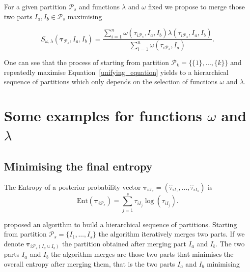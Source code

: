 \documentclass[10pt, a4paper]{article}
\newcommand{\m}[1]{\boldsymbol{#1}}
\begin{document}
\begin{spacing}{1.9}

For a given partition $\mathcal{P}_s$ and functions $\lambda$ and $\omega$ fixed we propose to merge those two parts $I_a, I_b \in \mathcal{P}_s$ maximising

\begin{equation}\label{unifying_equation}
S_{\omega, \lambda}( \m\tau_{\mathcal{P}_s},  I_a,  I_b) = \frac{\sum_{i=1}^n \omega(\tau_{i \mathcal{P}_s}, I_a, I_b) \lambda(\tau_{i \mathcal{P}_s}, I_a, I_b)}{\sum_{i=1}^n \omega(\tau_{i \mathcal{P}_s}, I_a) }.
\end{equation}


One can see that the process of starting from partition $\mathcal{P}_k = \{ \{1\}, \dots, \{k\} \}$ and repeatedly maximise Equation~\ref{unifying_equation} yields to a hierarchical sequence of partitions which only depends on the selection of functions $\omega$ and $\lambda$.


\section{Some examples for functions $\omega$ and $\lambda$}

\subsection{Minimising the final entropy}
\label{entropy_section}

The Entropy of a posterior probability vector $\m\tau_{i \mathcal{I}_s} = \left( \hat{\tau}_{i I_1} , \dots, \hat{\tau}_{i I_s}  \right)$ is
\[
\text{Ent}( \m\tau_{i \mathcal{P}_s} ) = \sum_{j=1}^s \tau_{i I_j}  \log(\tau_{i I_j} ).
\]


\cite{baudry2010combining} proposed an algorithm to build a hierarchical sequence of partitions. Starting from partition $\mathcal{P}_s = \{ I_1, \dots, I_s\}$ the algorithm iteratively merges two parts. If we denote $\m\tau_{i \mathcal{P}_s(I_a\cup I_b)}$ the partition obtained after merging part $I_a$ and $I_b$. The two parts $I_a$ and $I_b$ the algorithm merges are those two parts that minimises the overall entropy after merging them, that is the two parts $I_a$ and $I_b$ minimising


\end{spacing}
\end{document}
